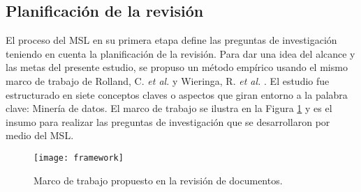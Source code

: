 \subsection{Planificación de la revisión}
El proceso del MSL en su primera etapa define las preguntas de investigación teniendo en cuenta la planificación de la revisión. 
Para dar una idea del alcance y las metas del presente estudio, se propuso un método empírico usando el mismo marco de trabajo de Rolland, C. \textit{et al.} \cite{Rolland1998} y Wieringa, R. \textit{et al.} \cite{Wieringa2006}. El estudio fue estructurado en siete conceptos claves o aspectos que giran entorno a la palabra clave: Minería de datos.  El marco de trabajo se ilustra en la Figura \ref{framework} y es el insumo para realizar las preguntas de investigación que se desarrollaron por medio del MSL.

\begin{figure}[h]
    \centering
    \texttt{[image: framework]}
    \caption{Marco de trabajo propuesto en la revisión de documentos.}
    \label{framework}
\end{figure}

